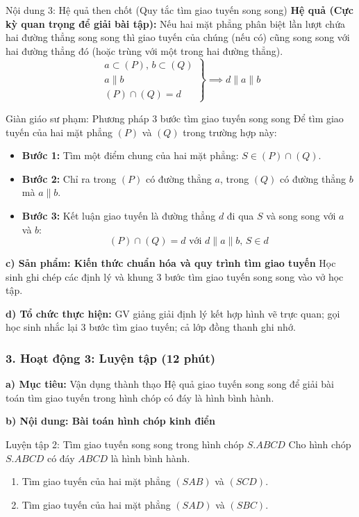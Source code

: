 \documentclass[12pt, a4paper]{article}
\begin{document}
\begin{pedabox}{Nội dung 3: Hệ quả then chốt (Quy tắc tìm giao tuyến song song)}
\textbf{Hệ quả (Cực kỳ quan trọng để giải bài tập):}
Nếu hai mặt phẳng phân biệt lần lượt chứa hai đường thẳng song song thì giao tuyến của chúng (nếu có) cũng song song với hai đường thẳng đó (hoặc trùng với một trong hai đường thẳng).
$$\left.\begin{array}{l} a \subset (P), \, b \subset (Q) \\ a \parallel b \\ (P) \cap (Q) = d \end{array}\right\} \implies d \parallel a \parallel b$$
\end{pedabox}

\begin{scaffoldbox}{Giàn giáo sư phạm: Phương pháp 3 bước tìm giao tuyến song song}
Để tìm giao tuyến của hai mặt phẳng $(P)$ và $(Q)$ trong trường hợp này:
\begin{itemize}[leftmargin=0.6cm]
    \item \textbf{Bước 1:} Tìm một điểm chung của hai mặt phẳng: $S \in (P) \cap (Q)$.
    \item \textbf{Bước 2:} Chỉ ra trong $(P)$ có đường thẳng $a$, trong $(Q)$ có đường thẳng $b$ mà $a \parallel b$.
    \item \textbf{Bước 3:} Kết luận giao tuyến là đường thẳng $d$ đi qua $S$ và song song với $a$ và $b$:
    $$(P) \cap (Q) = d \text{ với } d \parallel a \parallel b, \, S \in d$$
\end{itemize}
\end{scaffoldbox}

\noindent \textbf{c) Sản phẩm: Kiến thức chuẩn hóa và quy trình tìm giao tuyến}
Học sinh ghi chép các định lý và khung 3 bước tìm giao tuyến song song vào vở học tập.

\noindent \textbf{d) Tổ chức thực hiện:}
GV giảng giải định lý kết hợp hình vẽ trực quan; gọi học sinh nhắc lại 3 bước tìm giao tuyến; cả lớp đồng thanh ghi nhớ.

\subsubsection*{3. Hoạt động 3: Luyện tập (12 phút)}

\noindent \textbf{a) Mục tiêu:}
Vận dụng thành thạo Hệ quả giao tuyến song song để giải bài toán tìm giao tuyến trong hình chóp có đáy là hình bình hành.

\noindent \textbf{b) Nội dung: Bài toán hình chóp kinh điển}
\begin{pedabox}{Luyện tập 2: Tìm giao tuyến song song trong hình chóp $S.ABCD$}
Cho hình chóp $S.ABCD$ có đáy $ABCD$ là hình bình hành.
\begin{enumerate}[leftmargin=0.6cm]
    \item Tìm giao tuyến của hai mặt phẳng $(SAB)$ và $(SCD)$.
    \item Tìm giao tuyến của hai mặt phẳng $(SAD)$ và $(SBC)$.
\end{enumerate}
\end{pedabox}
\end{document}
